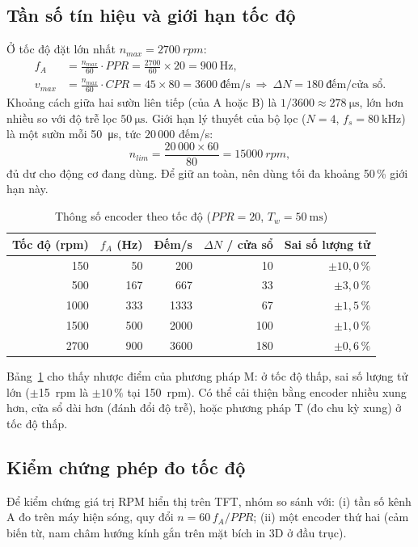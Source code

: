 \subsection{Tần số tín hiệu và giới hạn tốc độ}
Ở tốc độ đặt lớn nhất $n_{max}=\SI{2700}{rpm}$:
\begin{align}
  f_A &= \frac{n_{max}}{60}\cdot PPR = \frac{2700}{60}\times20 = \SI{900}{\hertz},\\
  v_{max} &= \frac{n_{max}}{60}\cdot CPR = 45\times80 = 3600\ \text{đếm/s}\ \Rightarrow\ \Delta N = 180\ \text{đếm/cửa sổ}.
\end{align}
Khoảng cách giữa hai sườn liên tiếp (của A hoặc B) là $1/3600\approx\SI{278}{\micro\second}$, lớn hơn nhiều so với độ trễ lọc $\SI{50}{\micro\second}$. Giới hạn lý thuyết của bộ lọc ($N=4$, $f_s=\SI{80}{\kilo\hertz}$) là một sườn mỗi \SI{50}{\micro\second}, tức $20\,000$ đếm/s:
\begin{equation}
  n_{lim}=\frac{20\,000\times60}{80}=\SI{15000}{rpm},
\end{equation}
đủ dư cho động cơ đang dùng. Để giữ an toàn, nên dùng tối đa khoảng 50\,\% giới hạn này.

\begin{table}[H]
\centering\small
\caption{Thông số encoder theo tốc độ ($PPR=20$, $T_w=\SI{50}{\milli\second}$)}
\label{tab:encoder}
\begin{tabular}{@{}rrrrr@{}}
\toprule
\textbf{Tốc độ (rpm)} & \textbf{$f_A$ (Hz)} & \textbf{Đếm/s} & \textbf{$\Delta N$ / cửa sổ} & \textbf{Sai số lượng tử}\\
\midrule
150 & 50 & 200 & 10 & $\pm10{,}0\,\%$\\
500 & 167 & 667 & 33 & $\pm3{,}0\,\%$\\
1000 & 333 & 1333 & 67 & $\pm1{,}5\,\%$\\
1500 & 500 & 2000 & 100 & $\pm1{,}0\,\%$\\
2700 & 900 & 3600 & 180 & $\pm0{,}6\,\%$\\
\bottomrule
\end{tabular}
\end{table}

Bảng~\ref{tab:encoder} cho thấy nhược điểm của phương pháp M: ở tốc độ thấp, sai số lượng tử lớn ($\pm$\SI{15}{rpm} là $\pm10\,\%$ tại \SI{150}{rpm}). Có thể cải thiện bằng encoder nhiều xung hơn, cửa sổ dài hơn (đánh đổi độ trễ), hoặc phương pháp T (đo chu kỳ xung) ở tốc độ thấp.

\subsection{Kiểm chứng phép đo tốc độ}
Để kiểm chứng giá trị RPM hiển thị trên TFT, nhóm so sánh với: (i) tần số kênh A đo trên máy hiện sóng, quy đổi $n=60\,f_A/PPR$; (ii) một encoder thứ hai (cảm biến từ, nam châm hướng kính gắn trên mặt bích in 3D ở đầu trục).

